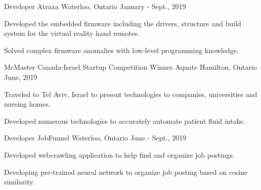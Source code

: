 
\begin{cventries}

  \cventry
    {Developer} %
    {Atraxa} %
    {Waterloo, Ontario} %
    {January - Sept., 2019} %
    {
      \begin{cvitems} %
        \item {Developed the embedded firmware including the drivers, structure and build system for the virtual reality hand remotes.}
        \item {Solved complex firmware anomalies with low-level programming knowledge.}
      \end{cvitems}
    }

  \cventry
    {McMaster Canada-Israel Startup Competition Winner} %
    {Aquate} %
    {Hamilton, Ontario} %
    {June, 2019} %
    {
      \begin{cvitems} %
        \item {Traveled to Tel Aviv, Israel to present technologies to companies, universities and nursing homes.}
        \item {Developed numerous technologies to accurately automate patient fluid intake.}
      \end{cvitems}
    }

  \cventry
    {Developer} %
    {JobFunnel} %
    {Waterloo, Ontario} %
    {June - Sept., 2019} %
    {
      \begin{cvitems} %
        \item {Developed webcrawling application to help find and organize job postings.}
        \item {Developing pre-trained neural network to organize job posting based on cosine similarity.}
      \end{cvitems}
    }


\end{cventries}
